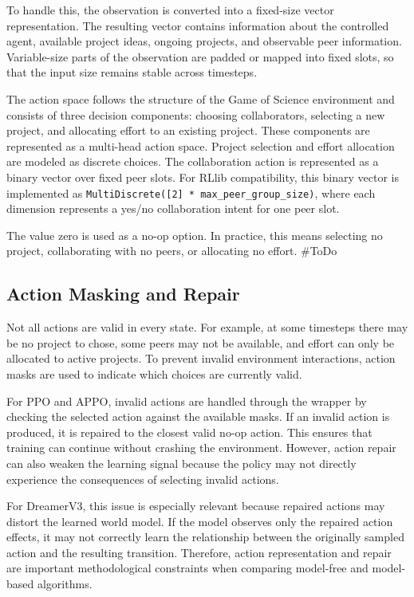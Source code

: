 \documentclass[english,bachelor]{hsluthesis}
\begin{document}
To handle this, the observation is converted into a fixed-size vector representation. The resulting vector contains information about the controlled agent, available project ideas, ongoing projects, and observable peer information. Variable-size parts of the observation are padded or mapped into fixed slots, so that the input size remains stable across timesteps.

The action space follows the structure of the Game of Science environment and consists of three decision components: choosing collaborators, selecting a new project, and allocating effort to an existing project. These components are represented as a multi-head action space. Project selection and effort allocation are modeled as discrete choices. The collaboration action is represented as a binary vector over fixed peer slots. For RLlib compatibility, this binary vector is implemented as \texttt{MultiDiscrete([2] * max\_peer\_group\_size)}, where each dimension represents a yes/no collaboration intent for one peer slot.

The value zero is used as a no-op option. In practice, this means selecting no project, collaborating with no peers, or allocating no effort.
#ToDo

\subsection{Action Masking and Repair}

Not all actions are valid in every state. For example, at some timesteps there may be no project to chose, some peers may not be available, and effort can only be allocated to active projects. To prevent invalid environment interactions, action masks are used to indicate which choices are currently valid.

For PPO and APPO, invalid actions are handled through the wrapper by checking the selected action against the available masks. If an invalid action is produced, it is repaired to the closest valid no-op action. This ensures that training can continue without crashing the environment. However, action repair can also weaken the learning signal because the policy may not directly experience the consequences of selecting invalid actions.

For DreamerV3, this issue is especially relevant because repaired actions may distort the learned world model. If the model observes only the repaired action effects, it may not correctly learn the relationship between the originally sampled action and the resulting transition. Therefore, action representation and repair are important methodological constraints when comparing model-free and model-based algorithms.
\end{document}
